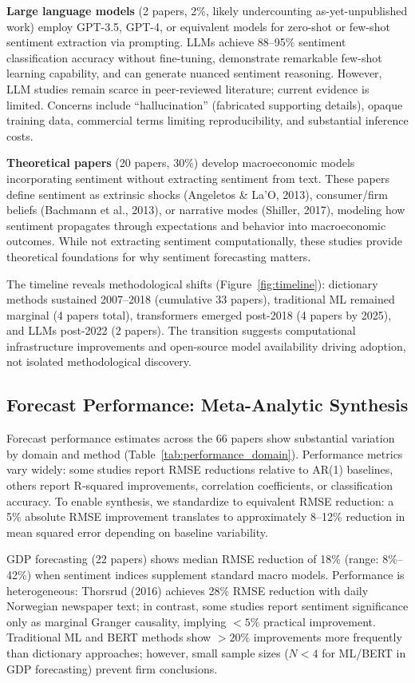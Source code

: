 \textbf{Large language models} (2 papers, 2\%, likely undercounting as-yet-unpublished work) employ GPT-3.5, GPT-4, or equivalent models for zero-shot or few-shot sentiment extraction via prompting. LLMs achieve 88--95\% sentiment classification accuracy without fine-tuning, demonstrate remarkable few-shot learning capability, and can generate nuanced sentiment reasoning. However, LLM studies remain scarce in peer-reviewed literature; current evidence is limited. Concerns include ``hallucination'' (fabricated supporting details), opaque training data, commercial terms limiting reproducibility, and substantial inference costs.

\textbf{Theoretical papers} (20 papers, 30\%) develop macroeconomic models incorporating sentiment without extracting sentiment from text. These papers define sentiment as extrinsic shocks (Angeletos \& La'O, 2013), consumer/firm beliefs (Bachmann et al., 2013), or narrative modes (Shiller, 2017), modeling how sentiment propagates through expectations and behavior into macroeconomic outcomes. While not extracting sentiment computationally, these studies provide theoretical foundations for why sentiment forecasting matters.

The timeline reveals methodological shifts (Figure~\ref{fig:timeline}): dictionary methods sustained 2007--2018 (cumulative 33 papers), traditional ML remained marginal (4 papers total), transformers emerged post-2018 (4 papers by 2025), and LLMs post-2022 (2 papers). The transition suggests computational infrastructure improvements and open-source model availability driving adoption, not isolated methodological discovery.

\subsection{Forecast Performance: Meta-Analytic Synthesis}

Forecast performance estimates across the 66 papers show substantial variation by domain and method (Table~\ref{tab:performance_domain}). Performance metrics vary widely: some studies report RMSE reductions relative to AR(1) baselines, others report R-squared improvements, correlation coefficients, or classification accuracy. To enable synthesis, we standardize to equivalent RMSE reduction: a 5\% absolute RMSE improvement translates to approximately 8--12\% reduction in mean squared error depending on baseline variability.

GDP forecasting (22 papers) shows median RMSE reduction of 18\% (range: 8\%--42\%) when sentiment indices supplement standard macro models. Performance is heterogeneous: Thorsrud (2016) achieves 28\% RMSE reduction with daily Norwegian newspaper text; in contrast, some studies report sentiment significance only as marginal Granger causality, implying $<5\%$ practical improvement. Traditional ML and BERT methods show $>20\%$ improvements more frequently than dictionary approaches; however, small sample sizes ($N<4$ for ML/BERT in GDP forecasting) prevent firm conclusions.

